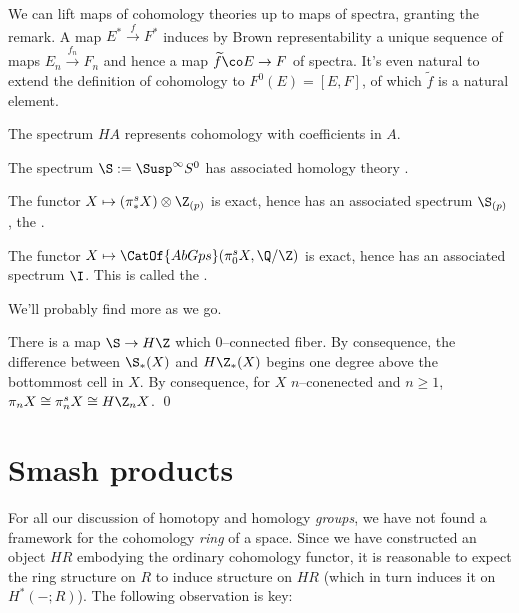 We can lift maps of cohomology theories up to maps of spectra, granting the remark.  A map $E^* \xrightarrow f F^*$ induces by Brown representability a unique sequence of maps $E_n \xrightarrow{f_n} F_n$ and hence a map $\widetilde f\co E \to F$ of spectra.  It's even natural to extend the definition of cohomology to $F^0(E) = [E, F]$, of which $\widetilde f$ is a natural element.

\begin{example}
The spectrum $HA$ represents cohomology with coefficients in $A$.
\end{example}

\begin{example}
The spectrum $\S := \Susp^\infty S^0$ has associated homology theory .
\end{example}

\begin{example}
The functor $X \mapsto (\pi_*^s X) \otimes \Z_{(p)}$ is exact, hence has an associated spectrum $\S_{(p)}$, the .
\end{example}

\begin{example}
The functor $X \mapsto \CatOf{AbGps}(\pi_0^s X, \Q/\Z)$ is exact, hence has an associated spectrum $\I$.  This is called the .
\end{example}

We'll probably find more as we go.

\begin{theorem}[Hurewicz]
There is a map $\S \to H\Z$ which $0$--connected fiber.  By consequence, the difference between $\S_*(X)$ and $H\Z_*(X)$ begins one degree above the bottommost cell in $X$.  By consequence, for $X$ $n$--conenected and $n \ge 1$, $\pi_n X \cong \pi_n^s X \cong H\Z_n X$. \qed
\end{theorem}




\section{Smash products}

For all our discussion of homotopy and homology \emph{groups}, we have not found a framework for the cohomology \emph{ring} of a space.  Since we have constructed an object $HR$ embodying the ordinary cohomology functor, it is reasonable to expect the ring structure on $R$ to induce structure on $HR$ (which in turn induces it on $H^*(-; R)$).  The following observation is key:

